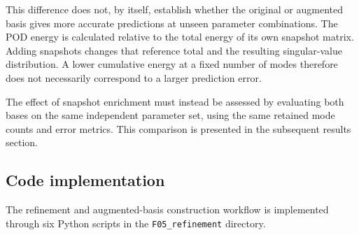 This difference does not, by itself, establish
whether the original or augmented basis gives more
accurate predictions at unseen parameter
combinations. The POD energy is calculated relative
to the total energy of its own snapshot matrix.
Adding snapshots changes that reference total and
the resulting singular-value distribution. A lower
cumulative energy at a fixed number of modes
therefore does not necessarily correspond to a
larger prediction error.

The effect of snapshot enrichment must instead be
assessed by evaluating both bases on the same
independent parameter set, using the same retained
mode counts and error metrics. This comparison is
presented in the subsequent results section.

\subsection{Code implementation}
\label{subsec:refinement_code}

The refinement and augmented-basis construction
workflow is implemented through six Python scripts
in the \texttt{F05\_refinement} directory.

